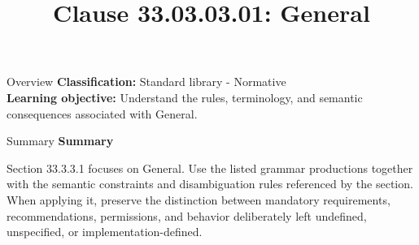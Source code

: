 \documentclass[10pt,letterpaper]{article}
\title{Clause 33.03.03.01: General}
\author{}
\date{}
\begin{document}
\maketitle
\begin{CornellOverviewBox}{Overview}
\textbf{Classification:} Standard library - Normative\\[2pt]
\textbf{Learning objective:} Understand the rules, terminology, and semantic consequences associated with General.
\end{CornellOverviewBox}\begin{CornellSummaryBox}{Summary}
{\sffamily\bfseries\color{Accent} Summary}\par\vspace{3pt}Section 33.3.3.1 focuses on General. Use the listed grammar productions together with the semantic constraints and disambiguation rules referenced by the section. When applying it, preserve the distinction between mandatory requirements, recommendations, permissions, and behavior deliberately left undefined, unspecified, or implementation-defined.
\end{CornellSummaryBox}
\end{document}

